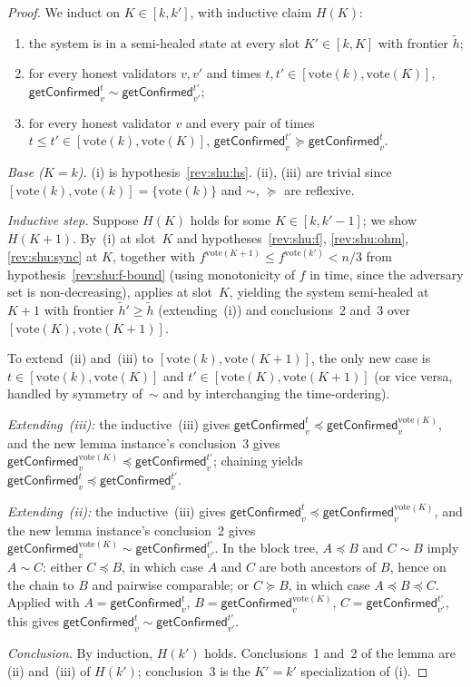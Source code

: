 \documentclass{article}
\newcommand{\vote}{\ensuremath{\mathrm{vote}}}
\newcommand{\comm}[1]{\ensuremath{\widetilde{#1}}}
\newcommand{\getConfirmed}{\textsf{getConfirmed}\xspace}
\theoremstyle{plain}
\theoremstyle{definition}
\theoremstyle{remark}
\begin{document}
\begin{proof}
We induct on $K \in [k, k']$, with inductive claim $H(K)$:
\begin{enumerate}
  \item the system is in a semi-healed state at every slot $K' \in [k, K]$ with frontier $\comm{h}$;
  \item for every honest validators $v, v'$ and times $t, t' \in [\vote(k), \vote(K)]$, $\getConfirmed_v^{t} \sim \getConfirmed_{v'}^{t'}$;
  \item for every honest validator $v$ and every pair of times $t \leq t' \in [\vote(k), \vote(K)]$, $\getConfirmed_v^{t'} \succeq \getConfirmed_v^t$.
\end{enumerate}

\emph{Base ($K = k$).}
(i) is hypothesis~\ref{rev:shu:hs}.
(ii), (iii) are trivial since $[\vote(k), \vote(k)] = \{\vote(k)\}$ and $\sim$, $\succeq$ are reflexive.

\emph{Inductive step.}
Suppose $H(K)$ holds for some $K \in [k, k'-1]$; we show $H(K{+}1)$.
By~(i) at slot~$K$ and hypotheses~\ref{rev:shu:f}, \ref{rev:shu:ohm}, \ref{rev:shu:sync} at $K$, together with $f^{\vote(K+1)} \leq f^{\vote(k')} < n/3$ from hypothesis~\ref{rev:shu:f-bound} (using monotonicity of $f$ in time, since the adversary set is non-decreasing),  applies at slot~$K$, yielding the system semi-healed at $K{+}1$ with frontier $\comm{h}' \geq \comm{h}$ (extending~(i)) and conclusions~2 and~3 over $[\vote(K), \vote(K{+}1)]$.

To extend~(ii) and~(iii) to $[\vote(k), \vote(K{+}1)]$, the only new case is $t \in [\vote(k), \vote(K)]$ and $t' \in [\vote(K), \vote(K{+}1)]$ (or vice versa, handled by symmetry of~$\sim$ and by interchanging the time-ordering).

\emph{Extending~(iii):}
the inductive~(iii) gives $\getConfirmed_v^t \preceq \getConfirmed_v^{\vote(K)}$, and the new lemma instance's conclusion~3 gives $\getConfirmed_v^{\vote(K)} \preceq \getConfirmed_v^{t'}$;
chaining yields $\getConfirmed_v^t \preceq \getConfirmed_v^{t'}$.

\emph{Extending~(ii):}
the inductive~(iii) gives $\getConfirmed_v^t \preceq \getConfirmed_v^{\vote(K)}$, and the new lemma instance's conclusion~2 gives $\getConfirmed_v^{\vote(K)} \sim \getConfirmed_{v'}^{t'}$.
In the block tree, $A \preceq B$ and $C \sim B$ imply $A \sim C$:
either $C \preceq B$, in which case $A$ and $C$ are both ancestors of $B$, hence on the chain to $B$ and pairwise comparable;
or $C \succeq B$, in which case $A \preceq B \preceq C$.
Applied with $A = \getConfirmed_v^t$, $B = \getConfirmed_v^{\vote(K)}$, $C = \getConfirmed_{v'}^{t'}$, this gives $\getConfirmed_v^t \sim \getConfirmed_{v'}^{t'}$.

\emph{Conclusion.}
By induction, $H(k')$ holds.
Conclusions~1 and~2 of the lemma are (ii) and~(iii) of $H(k')$;
conclusion~3 is the $K' = k'$ specialization of (i).
\end{proof}
\end{document}
